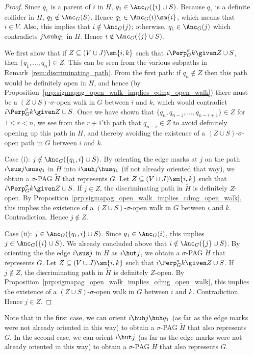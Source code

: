 \begin{proof}
  Since $q_1$ is a parent of $i$ in $H$, $q_1 \in \Anc_G(\{i\} \cup S)$.
  Because $q_1$ is a definite collider in $H$, $q_1 \notin \Anc_G(S)$.
  Hence $q_1 \in \Anc_G(i) \sm \{i\}$, which means that $i \in V$.
  Also, this implies that $i \notin \Anc_G(j)$; otherwise, $q_1 \in \Anc_G(j)$ which contradicts $j \suh q_1$ in $H$.
  Hence $i \notin \Anc_G(\{j\} \cup S)$.

  We first show that if $Z \subseteq (V \cup J) \sm \{i,k\}$ such that $i \Perp^\sigma_G k \given Z \cup S$, then $\{q_1, \dots, q_n\} \in Z$.
  This can be seen from the various subpaths in Remark~\ref{rem:discriminating_path}.
  From the first path: if $q_n \notin Z$ then this path would be definitely open in $H$, and hence (by Proposition~\ref{prp:sigmapag_open_walk_implies_cdmg_open_walk}) there must be a $(Z \cup S)$-$\sigma$-open walk in $G$ between $i$ and $k$, which would contradict $i \Perp^\sigma_G k \given Z \cup S$.
  Once we have shown that $\{q_n, q_{n-1}, \dots, q_{n-r+1}\} \in Z$ for $1 \le r < n$, we see from the $r+1$'th path that $q_{n-r} \in Z$ to avoid definitely opening up this path in $H$, and thereby avoiding the existence of a $(Z\cup S)$-$\sigma$-open path in $G$ between $i$ and $k$.

  Case (i): $j \notin \Anc_G(\{q_1,i\} \cup S)$.
  By orienting the edge marks at $j$ on the path $i \sus j \sus q_1$ in $H$ into $i \suh j \hus q_1$ (if not already oriented that way), we obtain a $\sigma$-PAG $\tilde{H}$ that represents $G$.
  Let $Z \subseteq (V \cup J) \sm \{i,k\}$ such that $i \Perp^\sigma_G k \given Z \cup S$. 
  If $j \in Z$, the discriminating path in $\tilde{H}$ is definitely $Z$-open.
  By Proposition~\ref{prp:sigmapag_open_walk_implies_cdmg_open_walk}, this implies the existence of a $(Z \cup S)$-$\sigma$-open walk in $G$ between $i$ and $k$.
  Contradiction. 
  Hence $j \notin Z$.

  Case (ii): $j \in \Anc_G(\{q_1,i\} \cup S)$. 
  Since $q_1 \in \Anc_G(i)$, this implies $j \in \Anc_G(\{i\} \cup S)$.
  We already concluded above that $i \notin \Anc_G(\{j\} \cup S)$.
  By orienting the the edge $i \sus j$ in $H$ as $i \hut j$, we obtain a $\sigma$-PAG $\tilde{H}$ that represents $G$.
  Let $Z \subseteq (V \cup J) \sm \{i,k\}$ such that $i \Perp^\sigma_G k \given Z \cup S$. 
  If $j \notin Z$, the discriminating path in $\tilde{H}$ is definitely $Z$-open.
  By Proposition~\ref{prp:sigmapag_open_walk_implies_cdmg_open_walk}, this implies the existence of a $(Z \cup S)$-$\sigma$-open walk in $G$ between $i$ and $k$.
  Contradiction. 
  Hence $j \in Z$.
\end{proof}
Note that in the first case, we can orient $i \huh j \huh q_1$ (as far as the edge marks were not already oriented in this way) to obtain a $\sigma$-PAG $\tilde{H}$ that also represents $G$. 
In the second case, we can orient $i \hut j$ (as far as the edge marks were not already oriented in this way) to obtain a $\sigma$-PAG $\tilde{H}$ that also represents $G$.

